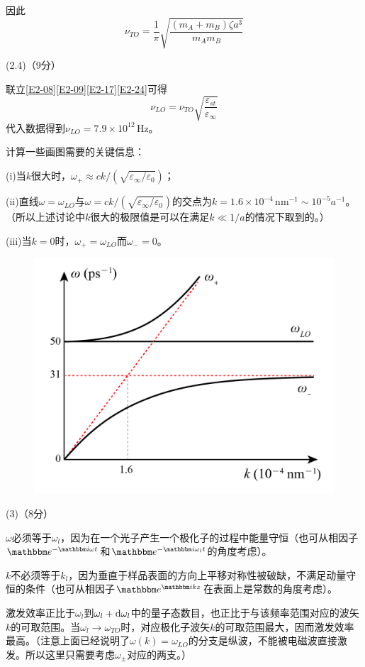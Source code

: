 \documentclass[10pt,a4paper,onecolumn,UTF8]{ctexart}
\begin{document}
	因此
	\begin{equation}\label{E2-24}
		\nu_{TO}=\frac 1 {\pi}\sqrt{\frac{(m_A+m_B)\zeta a^3}{m_Am_B}}
	\end{equation}
	
	(2.4)（9分）
	
	联立\eqref{E2-08}\eqref{E2-09}\eqref{E2-17}\eqref{E2-24}可得
	\begin{equation}
		\nu_{LO}=\nu_{TO}\sqrt{\frac{\varepsilon_{st}}{\varepsilon_{\infty}}}
	\end{equation}
	代入数据得到$\nu_{LO}=7.9\times10^{12}\,\text{Hz}$。
	
	计算一些画图需要的关键信息：
	
	(i)当$k$很大时，$\omega_+\approx ck/(\sqrt{\varepsilon_{\infty}/\varepsilon_0})$；
	
	(ii)直线$\omega=\omega_{LO}$与$\omega= ck/(\sqrt{\varepsilon_{\infty}/\varepsilon_0})$的交点为$k=1.6\times10^{-4}\,\text{nm}^{-1}\sim10^{-5}a^{-1}$。（所以上述讨论中$k$很大的极限值是可以在满足$k\ll1/a$的情况下取到的。）
	
	(iii)当$k=0$时，$\omega_+=\omega_{LO}$而$\omega_-=0$。
	
	\begin{figure}[!bh]
		\centering
		\includegraphics[width=0.6\columnwidth]{FA.png}
	\end{figure}
	
	(3)（8分）
	
	$\omega$必须等于$\omega_l$，因为在一个光子产生一个极化子的过程中能量守恒（也可从相因子$\ue^{-\ui\omega t}$和$\ue^{-\ui\omega_l t}$的角度考虑）。
	
	$k$不必须等于$k_l$，因为垂直于样品表面的方向上平移对称性被破缺，不满足动量守恒的条件（也可从相因子$\ue^{\ui k z}$在表面上是常数的角度考虑）。
	
	激发效率正比于$\omega_l$到$\omega_l+\mathrm{d}\omega_l$中的量子态数目，也正比于与该频率范围对应的波矢$k$的可取范围。当$\omega_l\to\omega_{TO}$时，对应极化子波矢$k$的可取范围最大，因而激发效率最高。（注意上面已经说明了$\omega(k)=\omega_{LO}$的分支是纵波，不能被电磁波直接激发。所以这里只需要考虑$\omega_{\pm}$对应的两支。）\\
	
\end{document}
